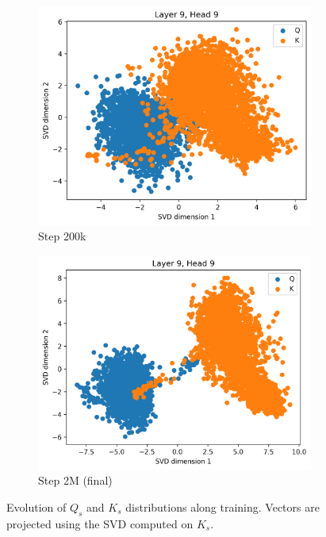 \begin{figure}[ht]
    \begin{subfigure}[b]{0.24\linewidth}
         \includegraphics[width=\linewidth]{sources/part_1/anisotropy/imgs/dist_l9h9_s200_K.png}
         \caption{Step 200k}
         \label{fig:dist_qk_s200_K}
    \end{subfigure}
    \begin{subfigure}[b]{0.24\linewidth}
         \includegraphics[width=\linewidth]{sources/part_1/anisotropy/imgs/dist_l9h9_s2000_K.png}
         \caption{Step 2M (final)}
         \label{fig:dist_qk_s2M_K}
    \end{subfigure}
    \caption{Evolution of $Q_s$ and $K_s$ distributions along training. Vectors are projected using the SVD computed on $K_s$.}
    \label{fig:proj_qk_heads_K}
\end{figure}

